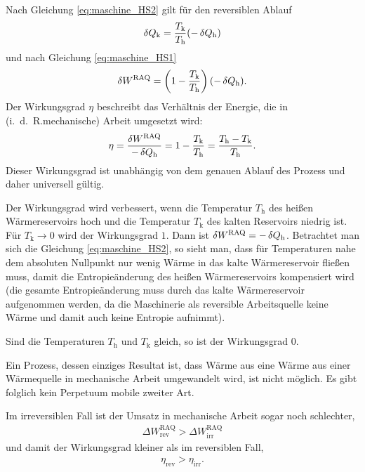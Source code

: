 Nach Gleichung \eqref{eq:maschine_HS2} gilt für den reversiblen Ablauf
\begin{align*}
    \mathop{}\!\delta Q_\mathrm{k} = \frac{T_\mathrm{k}}{T_\mathrm{h}} (-\mathop{}\!\delta Q_\mathrm{h})
\end{align*}
und nach Gleichung \eqref{eq:maschine_HS1}
\begin{align*}
    \mathop{}\!\delta W^\mathrm{RAQ} = \left( 1-\frac{T_\mathrm{k}}{T_\mathrm{h}} \right) (-\mathop{}\!\delta Q_\mathrm{h}).
\end{align*}
Der Wirkungsgrad $\eta$ beschreibt das Verhältnis der Energie, die in (i.~d.~R.mechanische) Arbeit umgesetzt wird:
\begin{align*}
    \eta = \frac{\mathop{}\!\delta W^\mathrm{RAQ}}{-\mathop{}\!\delta Q_\mathrm{h}} = 1-\frac{T_\mathrm{k}}{T_\mathrm{h}}=\frac{T_\mathrm{h}-T_\mathrm{k}}{T_\mathrm{h}}. 
\end{align*}
Dieser Wirkungsgrad ist unabhängig von dem genauen Ablauf des Prozess und daher universell gültig. 

Der Wirkungsgrad wird verbessert, wenn die Temperatur $T_\mathrm{h}$ des heißen Wärmereservoirs hoch und die Temperatur $T_\mathrm{k}$ des kalten Reservoirs niedrig ist. Für $T_\mathrm{k}\rightarrow 0$ wird der Wirkungsgrad $1$. 
Dann ist $\mathop{}\!\delta W^\mathrm{RAQ}=-\mathop{}\!\delta Q_\mathrm{h}$. 
Betrachtet man sich die Gleichung \eqref{eq:maschine_HS2}, so sieht man, dass für Temperaturen nahe dem absoluten Nullpunkt nur wenig Wärme in das kalte Wärmereservoir fließen muss, damit die Entropieänderung des heißen Wärmereservoirs kompensiert wird (die gesamte Entropieänderung muss durch das kalte Wärmereservoir aufgenommen werden, da die Maschinerie als reversible Arbeitsquelle keine Wärme und damit auch keine Entropie aufnimmt). 

Sind die Temperaturen $T_\mathrm{h}$ und $T_\mathrm{k}$ gleich, so ist der Wirkungsgrad $0$. 
\begin{formal}
    Ein Prozess, dessen einziges Resultat ist, dass Wärme aus eine Wärme aus einer Wärmequelle in mechanische Arbeit umgewandelt wird, ist nicht möglich. Es gibt folglich kein Perpetuum mobile zweiter Art. 
\end{formal}


Im irreversiblen Fall ist der Umsatz in mechanische Arbeit sogar noch schlechter, 
\begin{align*}
    \Delta W_\mathrm{rev}^\mathrm{RAQ} > \Delta W_\mathrm{irr}^\mathrm{RAQ}
\end{align*}
und damit der Wirkungsgrad kleiner als im reversiblen Fall,
\begin{align*}
    \eta_\mathrm{rev}>\eta_\mathrm{irr}. 
\end{align*}



